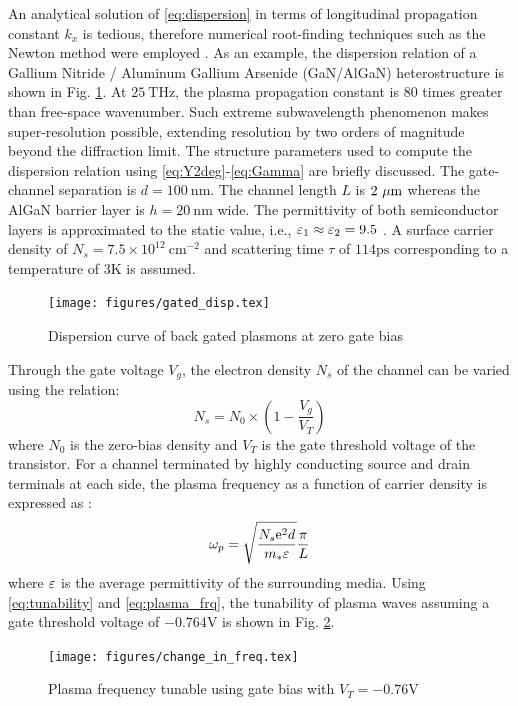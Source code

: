 \documentclass[11pt]{article}
\begin{document}
An analytical solution of \eqref{eq:dispersion} in terms of longitudinal propagation constant $k_x$ is tedious, therefore numerical root-finding techniques such as the Newton method were employed \cite{9780521880688}. As an example, the dispersion relation of a Gallium Nitride / Aluminum Gallium Arsenide (GaN/AlGaN) heterostructure is shown in Fig. \ref{fig:dispersion}. At $25~ \mathrm{THz}$, the plasma propagation constant is 80 times greater than free-space wavenumber. Such extreme subwavelength phenomenon makes super-resolution possible, extending resolution by two orders of magnitude beyond the diffraction limit. The structure parameters used to compute the dispersion relation using \eqref{eq:Y2deg}-\eqref{eq:Gamma} are briefly discussed. The gate-channel separation is $d = 100~\mathrm{nm}$. The channel length $L$ is $2~\mathrm{\mu m}$ whereas the AlGaN barrier layer is
$h = 20~ \mathrm{nm}$ wide. The permittivity of both semiconductor layers is approximated to the static value, i.e., $\varepsilon_1 \approx \varepsilon_2 = 9.5$ \cite{Muravjov2010}. A surface carrier density of $N_s = 7.5 \times 10^{12}~ \mathrm{cm}^{-2}$ and scattering time $\tau$ of $114 \mathrm{ps}$ corresponding to a temperature of $3 \mathrm{K}$ is assumed.
%
\begin{figure}[h]
  \begin{center}
    \noindent
    \texttt{[image: figures/gated\_disp.tex]}
    \caption{Dispersion curve of back gated plasmons at zero gate bias}
    \label{fig:dispersion}
  \end{center}
\end{figure}
%
Through the gate voltage $V_g$, the electron density $N_s$ of the channel can be varied using the relation:
%
\begin{equation}
  N_s = N_0 \times(1 - \frac{V_g}{V_T})
  \label{eq:tunability}
\end{equation}
%
where $N_0$ is the zero-bias density and $V_T$ is the gate threshold voltage of the transistor. For a channel terminated by highly conducting source and drain terminals at each side, the plasma frequency as a function of carrier density is expressed as \cite{Popov2008}:
%
\begin{equation}
  \omega_p = \sqrt{\frac{N_s \mathrm{e}^2 d}{m_{\ast} \varepsilon}} \frac{\pi}{L}
  \label{eq:plasma_frq}
\end{equation}
%
where $\varepsilon$ is the average permittivity of the surrounding media. Using \eqref{eq:tunability} and \eqref{eq:plasma_frq}, the tunability of plasma waves assuming  a gate threshold voltage of $-0.764 \mathrm{V}$ is shown in Fig. \ref{fig:tuning}.
\begin{figure}[h]
  \begin{center}
    \noindent
    \texttt{[image: figures/change\_in\_freq.tex]}
    \caption{Plasma frequency tunable using gate bias with $V_T = -0.76 \mathrm{V}$}
    \label{fig:tuning}
  \end{center}
\end{figure}
%
\end{document}
